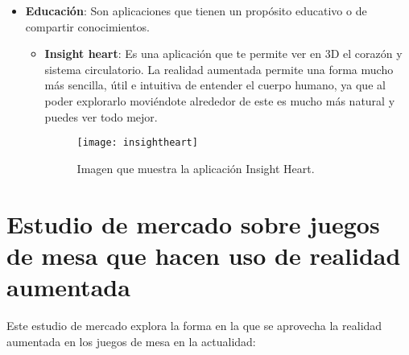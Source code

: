 \begin{itemize}
\begin{itemize}
  \end{itemize}

\newpage

  \item \textbf{Educación}: Son aplicaciones que tienen un propósito educativo o de compartir conocimientos.

  \begin{itemize}
    \item \textbf{Insight heart}: Es una aplicación que te permite ver en 3D el corazón y sistema circulatorio. La realidad aumentada permite una forma mucho más sencilla, útil e intuitiva de entender el cuerpo humano, ya que al poder explorarlo moviéndote alrededor de este es mucho más natural y puedes ver todo mejor.

    \begin{figure}[h]
      \centering
      \texttt{[image: insightheart]}
      \caption{Imagen que muestra la aplicación Insight Heart.\protect\footnotemark}
      \label{figura-insight-heart}
    \end{figure}

  \end{itemize}
\end{itemize}


\section{Estudio de mercado sobre juegos de mesa que hacen uso de realidad aumentada}

Este estudio de mercado explora la forma en la que se aprovecha la realidad aumentada en los juegos de mesa en la actualidad:

